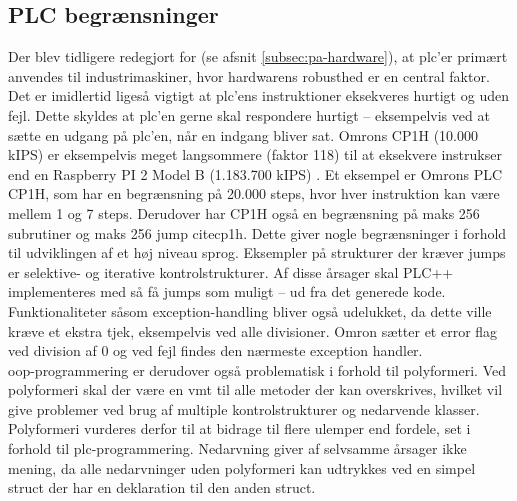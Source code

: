 \subsection{PLC begrænsninger}\label{sec:plcprob}
Der blev tidligere redegjort for (se afsnit \ref{subsec:pa-hardware}), at \gls{plc}’er primært anvendes til industrimaskiner, hvor hardwarens robusthed er en central faktor. Det er imidlertid ligeså vigtigt at \gls{plc}’ens instruktioner eksekveres hurtigt og uden fejl. Dette skyldes at \gls{plc}’en gerne skal respondere hurtigt – eksempelvis ved at sætte en udgang på \gls{plc}’en, når en indgang bliver sat. Omrons CP1H (10.000 kIPS) er eksempelvis meget langsommere (faktor 118) til at eksekvere instrukser end en Raspberry PI 2 Model B (1.183.700 kIPS) \cite{raspBench}. Et eksempel er Omrons PLC CP1H, som har en begrænsning på 20.000 steps, hvor hver instruktion kan være mellem 1 og 7 steps. Derudover har CP1H også en begrænsning på maks 256 subrutiner og maks 256 jump cite{cp1h}. Dette giver nogle begrænsninger i forhold til udviklingen af et høj niveau sprog. Eksempler på strukturer der kræver jumps er selektive- og iterative kontrolstrukturer. Af disse årsager skal PLC++ implementeres med så få jumps som muligt – ud fra det generede kode. Funktionaliteter såsom exception-handling bliver også udelukket, da dette ville kræve et ekstra tjek, eksempelvis ved alle divisioner. Omron sætter et error flag ved division af 0 og ved fejl findes den nærmeste exception handler. \cite{exceptionHandling}\\





\noindent \gls{oop}-programmering er derudover også problematisk i forhold til polyformeri. Ved polyformeri skal der være en \gls{vmt} til alle metoder der kan overskrives, hvilket vil give problemer ved brug af multiple kontrolstrukturer og nedarvende klasser. Polyformeri vurderes derfor 
til at bidrage til flere ulemper end fordele, set i forhold til \gls{plc}-programmering. Nedarvning giver af selvsamme årsager ikke mening, da alle nedarvninger uden polyformeri kan udtrykkes ved en simpel struct der har en deklaration til den anden struct. \cite{Sebesta_2013}\\ 

